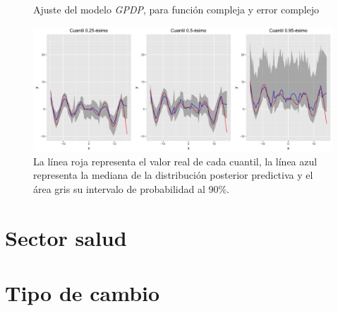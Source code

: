 \begin{figure}[H]
	\centering
	\caption{Ajuste del modelo \textit{GPDP}, para funci\'on compleja y error complejo}
	\includegraphics[width=\textwidth]{Figures/Simulation/complex_g_complex_error/fitted_models.png}
	\captionsetup{singlelinecheck=off,font=footnotesize}
    \caption*{La l\'inea roja representa el valor real de cada cuantil, la l\'inea azul representa la mediana de la distribuci\'on posterior predictiva y el \'area gris su intervalo de probabilidad al 90\%.}
	\label{fitted_cgce}
\end{figure}

\section{Sector salud}


\section{Tipo de cambio}

\newpage